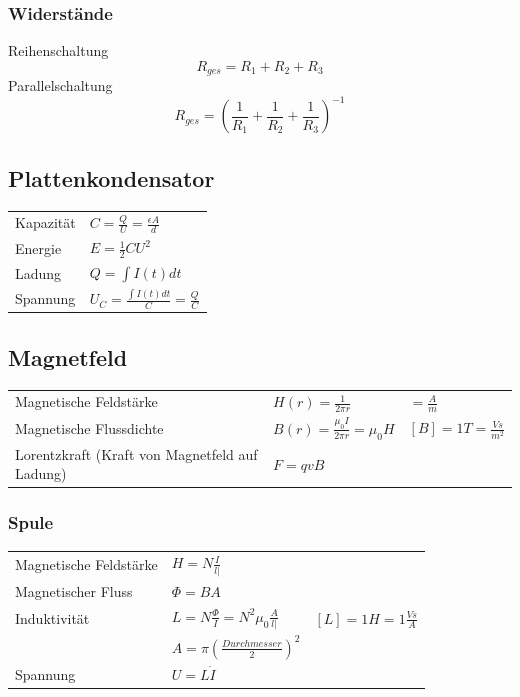 \subsubsection{Widerstände}
Reihenschaltung
$$ R_{ges} = R_1 + R_2 + R_3$$
Parallelschaltung
$$ R_{ges} = (\frac{1}{R_1}+\frac{1}{R_2}+\frac{1}{R_3})^{-1} $$



\subsection{Plattenkondensator}


\begin{tabular}{ll}
Kapazität & $  C = \frac{Q}{U} = \frac{\epsilon A}{d} $ \\
Energie & $ E = \frac{1}{2}CU^2 $ \\
Ladung & $Q = \int I(t) dt$ \\
Spannung & $U_C = \frac{\int I(t) dt}{C} = \frac{Q}{C}$
\end{tabular}


\subsection{Magnetfeld}


\begin{tabular}{|ll|l|}
Magnetische Feldstärke & $ H(r) = \frac{1}{2 \pi r} $ & $  = \frac{A}{m}$\\
Magnetische Flussdichte & $ B(r) = \frac{\mu_{0}I}{2\pi r} =  \mu_{0}H$ & $ [B] = 1T = \frac{Vs}{m^2}$ \\
Lorentzkraft (Kraft von Magnetfeld auf Ladung) & $ F = qvB $
\end{tabular}


\subsubsection{Spule}


\begin{tabular}{|ll|l|}
Magnetische Feldstärke & $H = N\frac{I}{l|}$\\
Magnetischer Fluss & $ \Phi = BA $ \\
Induktivität & $ L = N \frac{\Phi}{I} = N^2 \mu_{0} \frac{A}{l|}$ & $[L] = 1H = 1 \frac{Vs}{A}$ \\
& $ A = \pi  (\frac{Durchmesser}{2})^2$ \\
Spannung & $U = L \dot{I}$
\end{tabular}

